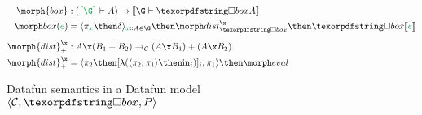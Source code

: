 \begin{figure*}

  \begin{align*}
    \morph{box} &: (\stripcxd\G \vdash A) \to \den{\G \vdash \iso A}
    \\
    \boxd e &= \fork{\pi_{\dvar x} \then \delta}_{\hd x A \in \G} \then \discox
    \then \iso \den{\isocolor e}
    \\[1ex]
    \morph{dist}^\x_+ &: A \x (B_1 + B_2) \to_\catC (A \x B_1) + (A \x B_2)
    \\
    \morph{dist}^\x_+ &= \fork{\pi_2 \then \krof{\lambda (\fork{\pi_2,\pi_1} \then \injc_i)}_i, \pi_1}
    \then \eval
  \end{align*}


  \caption{Datafun semantics in a Datafun model $\tuple{\catC, \disco, \pfin}$}
  \label{fig:semantics}\label{def:strip}
\end{figure*}

